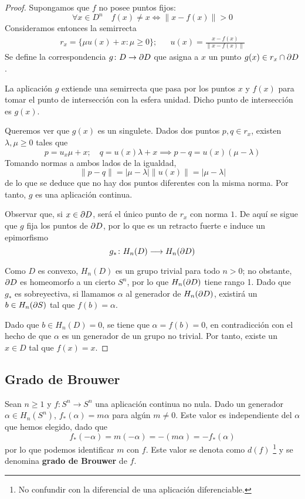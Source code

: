 \begin{proof}
Supongamos que $f$ no posee puntos fijos:
\[\forall x\in D^n \quad f(x)\neq x \iff \|x-f(x)\| > 0\]
Consideramos entonces la semirrecta
\begin{align*}
r_x=\{\mu u(x)+x: \mu \geq 0\}; && u(x)=\frac{x-f(x)}{\|x-f(x)\|}
\end{align*}
Se define la correspondencia $g\colon D \to \partial D$ que asigna a $x$ un
punto $g(x)\in r_x\cap \partial D$.

\begin{marginfigure}

\caption[Aplicación $g$ ilustrada.]{La aplicación $g$ extiende una semirrecta
que pasa por los puntos $x$ y $f(x)$ para tomar el punto de intersección
con la esfera unidad. Dicho punto de intersección es $g(x)$.}
\end{marginfigure}

Queremos ver que $g(x)$ es un singulete. Dados dos puntos $p,q \in r_x$,
existen $\lambda, \mu \geq 0$ tales que
\[p=u_x\mu+x; \quad q=u(x)\lambda+x \implies p-q=u(x)(\mu-\lambda)\]
Tomando normas a ambos lados de la igualdad,
\[\|p-q\|=|\mu-\lambda|\|u(x)\|=|\mu-\lambda|\]
de lo que se deduce que no hay dos puntos diferentes con la misma norma. Por
tanto, $g$ es una aplicación continua.

Observar que, si $x \in \partial D$, será el único punto de $r_x$ con norma $1$.
De aquí se sigue que $g$ fija los puntos de $\partial D$, por lo que es un retracto
fuerte e induce un epimorfismo
\[g_*\colon H_n(D) \longrightarrow H_n(\partial D)\]

Como $D$ es convexo, $H_n(D)$ es un grupo trivial para todo $n > 0$; no
obstante, $\partial D$ es homeomorfo a un cierto $S^n$, por lo que $H_n(\partial D)$
tiene rango 1. Dado que $g_*$ es sobreyectiva, si llamamos $\alpha$ al
generador de $H_n(\partial D)$, existirá un $b \in H_n(\partial S)$ tal que $f(b)=\alpha$.

Dado que $b \in H_n(D)=0$, se tiene que $\alpha=f(b)=0$, en contradicción
con el hecho de que $\alpha$ es un generador de un grupo no trivial. Por tanto,
existe un $x \in D$ tal que $f(x)=x$.
\end{proof}

\subsection{Grado de Brouwer}
Sean $n \geq 1$ y $f\colon S^n \to S^n$ una aplicación continua no nula. Dado
un generador $\alpha \in H_n(S^n)$, $f_*(\alpha)=m\alpha$ para algún
$m\neq 0$. Este valor es independiente del $\alpha$ que hemos elegido, dado
que
\[f_*(-\alpha)=m(-\alpha)=-(m\alpha)=-f_*(\alpha)\]
por lo que podemos identificar $m$ con $f$. Este valor se denota como $d(f)$
\footnote{No confundir con la diferencial de una aplicación diferenciable.}
y se denomina \textbf{grado de Brouwer} de $f$.

